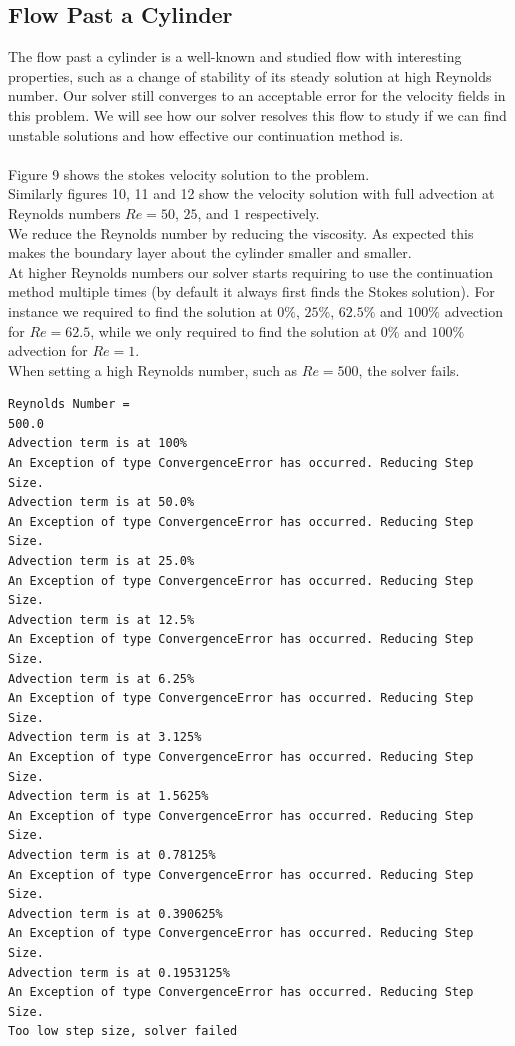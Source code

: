 \documentclass[11pt,twoside,a4paper]{article}
\begin{document}
\subsection{Flow Past a Cylinder}

The flow past a cylinder is a well-known and studied flow with interesting properties, such as a change of stability of its steady solution at high Reynolds number.
Our solver still converges to an acceptable error for the velocity fields in this problem.
We will see how our solver resolves this flow to study if we can find unstable solutions and how effective our continuation method is.\\
\\
Figure 9 shows the stokes velocity solution to the problem.\\
Similarly figures 10, 11 and 12 show the velocity solution with full advection at Reynolds numbers $Re = 50$, $25$, and $1$ respectively.\\
We reduce the Reynolds number by reducing the viscosity. As expected this makes the boundary layer about the cylinder smaller and smaller.\\
At higher Reynolds numbers our solver starts requiring to use the continuation method multiple times (by default it always first finds the Stokes solution). For instance we required to find the solution at $0 \%$, $25 \%$, $62.5\%$ and $100\%$ advection for $Re =62.5$, while we only required to find the solution at $0 \%$ and $100 \%$ advection for $Re = 1$.\\
When setting a high Reynolds number, such as $Re = 500$, the solver fails.
\begin{lstlisting}
Reynolds Number =
500.0
Advection term is at 100%
An Exception of type ConvergenceError has occurred. Reducing Step Size.
Advection term is at 50.0%
An Exception of type ConvergenceError has occurred. Reducing Step Size.
Advection term is at 25.0%
An Exception of type ConvergenceError has occurred. Reducing Step Size.
Advection term is at 12.5%
An Exception of type ConvergenceError has occurred. Reducing Step Size.
Advection term is at 6.25%
An Exception of type ConvergenceError has occurred. Reducing Step Size.
Advection term is at 3.125%
An Exception of type ConvergenceError has occurred. Reducing Step Size.
Advection term is at 1.5625%
An Exception of type ConvergenceError has occurred. Reducing Step Size.
Advection term is at 0.78125%
An Exception of type ConvergenceError has occurred. Reducing Step Size.
Advection term is at 0.390625%
An Exception of type ConvergenceError has occurred. Reducing Step Size.
Advection term is at 0.1953125%
An Exception of type ConvergenceError has occurred. Reducing Step Size.
Too low step size, solver failed
\end{lstlisting}
\end{document}
